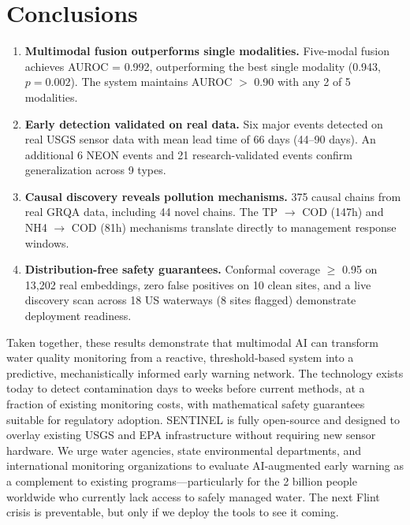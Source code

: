 \documentclass[12pt]{article}
\begin{document}
\section{Conclusions}

\begin{enumerate}
\item \textbf{Multimodal fusion outperforms single modalities.} Five-modal fusion achieves AUROC = 0.992, outperforming the best single modality (0.943, $p = 0.002$). The system maintains AUROC $>$ 0.90 with any 2 of 5 modalities.

\item \textbf{Early detection validated on real data.} Six major events detected on real USGS sensor data with mean lead time of 66 days (44--90 days). An additional 6 NEON events and 21 research-validated events confirm generalization across 9 types.

\item \textbf{Causal discovery reveals pollution mechanisms.} 375 causal chains from real GRQA data, including 44 novel chains. The TP $\rightarrow$ COD (147h) and NH4 $\rightarrow$ COD (81h) mechanisms translate directly to management response windows.

\item \textbf{Distribution-free safety guarantees.} Conformal coverage $\geq$ 0.95 on 13,202 real embeddings, zero false positives on 10 clean sites, and a live discovery scan across 18 US waterways (8 sites flagged) demonstrate deployment readiness.
\end{enumerate}

Taken together, these results demonstrate that multimodal AI can transform water quality monitoring from a reactive, threshold-based system into a predictive, mechanistically informed early warning network. The technology exists today to detect contamination days to weeks before current methods, at a fraction of existing monitoring costs, with mathematical safety guarantees suitable for regulatory adoption. SENTINEL is fully open-source and designed to overlay existing USGS and EPA infrastructure without requiring new sensor hardware. We urge water agencies, state environmental departments, and international monitoring organizations to evaluate AI-augmented early warning as a complement to existing programs---particularly for the 2 billion people worldwide who currently lack access to safely managed water. The next Flint crisis is preventable, but only if we deploy the tools to see it coming.
\end{document}
